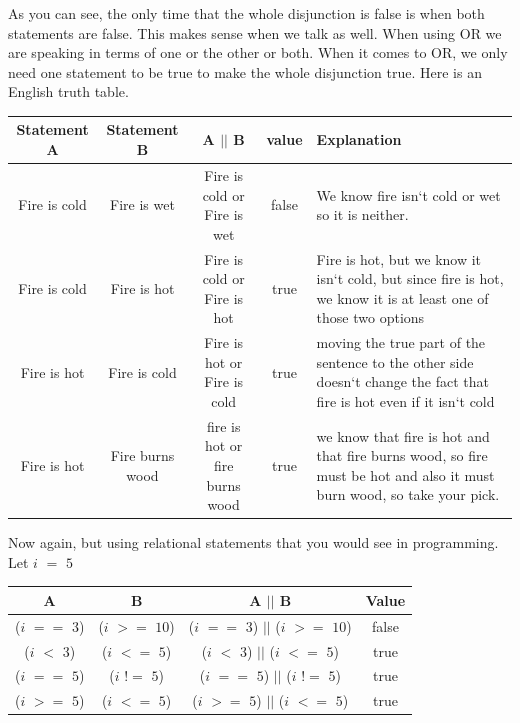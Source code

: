 \documentclass[11]{article}
\begin{document}
As you can see, the only time that the whole disjunction is false is when both statements are false. This makes sense when we talk as well. When using OR we are speaking in terms of one or the other or both. When it comes to OR, we only need one statement to be true to make the whole disjunction true. Here is an English truth table.

\begin{center}
  \begin{tabular}{ | c | c | c | c | p{4.5cm} |}
    \hline
		Statement A & Statement B & A $||$ B & value & Explanation \\ \hline
		Fire is cold & Fire is wet & Fire is cold or Fire is wet & false & We know fire isn`t cold or wet so it is neither. \\  \hline
		
		Fire is cold & Fire is hot & Fire is cold or Fire is hot & true & Fire is hot, but we know it isn`t cold, but since fire is hot, we know it is at least one of those two options \\ \hline
		
		Fire is hot & Fire is cold & Fire is hot or Fire is cold & true & moving the true part of the sentence to the other side doesn`t change the fact that fire is hot even if it isn`t cold \\ \hline
		
		Fire is hot & Fire burns wood & fire is hot or fire burns wood & true & we know that fire is hot and that fire burns wood, so fire must be hot and also it must burn wood, so take your pick. \\
    \hline
  \end{tabular}
\end{center}

Now again, but using relational statements that you would see in programming. Let $i$ $=$ $5$
\begin{center}
  \begin{tabular}{ | c | c | c | c |}
    \hline
    A & B & A $||$ B & Value\\ \hline
    ($i$ $==$ $3$) & ($i$ $>=$ $10$) & ($i$ $==$ $3$) $||$ ($i$ $>=$ $10$) & false \\ \hline
    ($i$ $<$ $3$) & ($i$ $<=$ $5$) & ($i$ $<$ $3$) $||$ ($i$ $<=$ $5$) & true \\ \hline
    ($i$ $==$ $5$) & ($i$ $!=$ $5$) &  ($i$ $==$ $5$) $||$ ($i$ $!=$ $5$)& true \\ \hline
    ($i$ $>=$ $5$) & ($i$ $<=$ $5$) & ($i$ $>=$ $5$) $||$ ($i$ $<=$ $5$) & true \\
    \hline
  \end{tabular}
\end{center}
\end{document}
